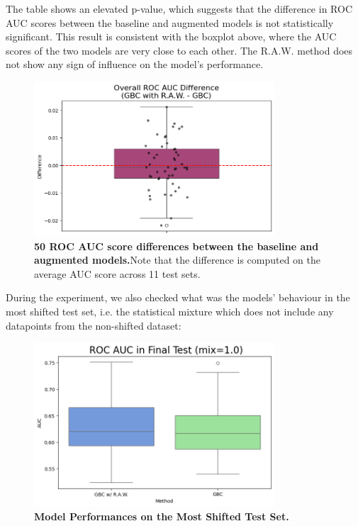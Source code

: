 The table shows an elevated p-value, which suggests that the difference in ROC AUC scores between the baseline and augmented models is not statistically significant. This result is consistent with the boxplot above, where the AUC scores of the two models are very close to each other. The R.A.W. method does not show any sign of influence on the model's performance.

\begin{figure}[H]
    \centering
    \includegraphics[width=0.8\textwidth]{assets/RealRawdiff.png} 
    \caption{\textbf{50 ROC AUC score differences between the baseline and augmented models.}Note that the difference is computed on the average AUC score across 11 test sets.}
\end{figure}


During the experiment, we also checked what was the models' behaviour in the most shifted test set, i.e. the statistical mixture which does not include any datapoints from the non-shifted dataset:

\begin{figure}[H]
    \centering
    \includegraphics[width=0.8\textwidth]{assets/RealRawLAST.png} 
    \caption{\textbf{Model Performances on the Most Shifted Test Set.}}
\end{figure}

